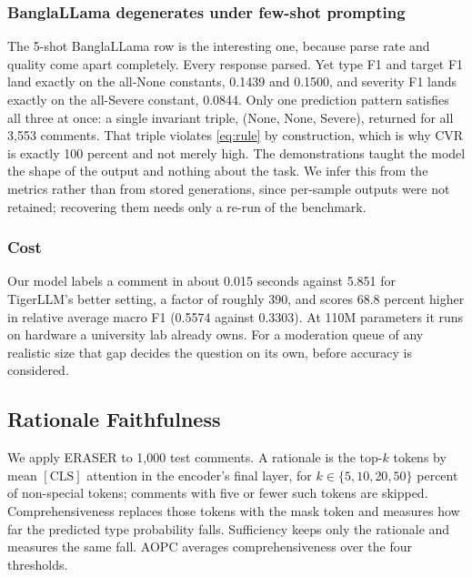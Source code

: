 \documentclass[conference]{IEEEtran}
\begin{document}
\subsubsection{BanglaLLama degenerates under few-shot prompting}
The 5-shot BanglaLLama row is the interesting one, because parse rate and quality come apart completely. Every response parsed. Yet type F1 and target F1 land exactly on the all-None constants, 0.1439 and 0.1500, and severity F1 lands exactly on the all-Severe constant, 0.0844. Only one prediction pattern satisfies all three at once: a single invariant triple, (None, None, Severe), returned for all 3{,}553 comments. That triple violates \eqref{eq:rule} by construction, which is why CVR is exactly 100 percent and not merely high. The demonstrations taught the model the shape of the output and nothing about the task. We infer this from the metrics rather than from stored generations, since per-sample outputs were not retained; recovering them needs only a re-run of the benchmark.

\subsubsection{Cost}
Our model labels a comment in about 0.015 seconds against 5.851 for TigerLLM's better setting, a factor of roughly 390, and scores 68.8 percent higher in relative average macro F1 (0.5574 against 0.3303). At 110M parameters it runs on hardware a university lab already owns. For a moderation queue of any realistic size that gap decides the question on its own, before accuracy is considered.

\subsection{Rationale Faithfulness}
We apply ERASER \cite{deyoung2020eraser} to 1{,}000 test comments. A rationale is the top-$k$ tokens by mean $[\text{CLS}]$ attention in the encoder's final layer, for $k \in \{5, 10, 20, 50\}$ percent of non-special tokens; comments with five or fewer such tokens are skipped. Comprehensiveness replaces those tokens with the mask token and measures how far the predicted type probability falls. Sufficiency keeps only the rationale and measures the same fall. AOPC averages comprehensiveness over the four thresholds.
\end{document}
